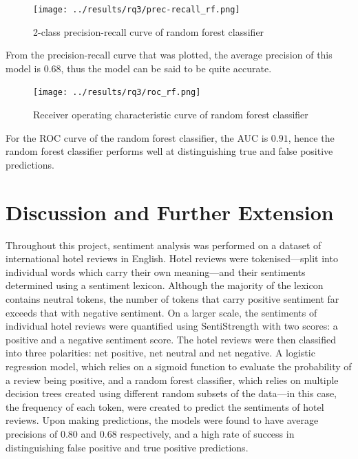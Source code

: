 \documentclass[12pt,bibliography=totocnumbered]{scrartcl}
\begin{document}
\begin{figure}[htpb]
	\begin{center}
		\texttt{[image: ../results/rq3/prec-recall\_rf.png]}
	\end{center}
	\caption{2-class precision-recall curve of random forest classifier}
	\label{fig:rf-prcurve}
\end{figure}

From the precision-recall curve that was plotted, the average precision
of this model is $0.68$, thus the model can be said to be quite accurate.

\begin{figure}[htpb]
	\begin{center}
		\texttt{[image: ../results/rq3/roc\_rf.png]}
	\end{center}
	\caption{Receiver operating characteristic curve of random forest classifier}
	\label{fig:rf-roc}
\end{figure}

For the ROC curve of the random forest classifier, the AUC is $0.91$, hence
the random forest classifier performs well at distinguishing true and false
positive predictions.

\section{Discussion and Further Extension}
Throughout this project, sentiment analysis was performed on a dataset of
international hotel reviews in English. Hotel reviews were tokenised---split
into individual words which carry their own meaning---and their sentiments
determined using a sentiment lexicon. Although the majority of the lexicon
contains neutral tokens, the number of tokens that carry positive sentiment
far exceeds that with negative sentiment. On a larger scale, the sentiments
of individual hotel reviews were quantified using SentiStrength with two scores:
a positive and a negative sentiment score. The hotel reviews were then classified
into three polarities: net positive, net neutral and net negative. A logistic
regression model, which relies on a sigmoid function to evaluate the probability
of a review being positive, and a random forest classifier, which relies on multiple
decision trees created using different random subsets of the data---in this case, the
frequency of each token, were created to predict the sentiments of hotel reviews. Upon
making predictions, the models were found to have average precisions of $0.80$ and $0.68$
respectively, and a high rate of success in distinguishing false positive
and true positive predictions.
\end{document}
